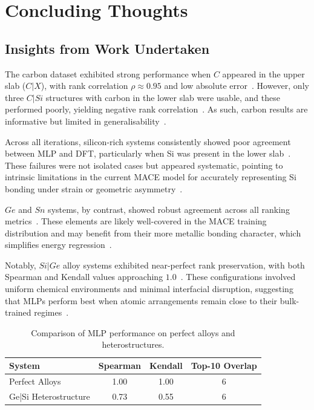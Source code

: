 \chapter{Concluding Thoughts} \label{chapter:conclusions}

\section{Insights from Work Undertaken} \label{section:insights_from_work}

The carbon dataset exhibited strong performance when $C$ appeared in the upper slab ($C|X$), with rank correlation $\rho \approx 0.95$ and low absolute error~\nocite{}.
However, only three $C|Si$ structures with carbon in the lower slab were usable, and these performed poorly, yielding negative rank correlation~\nocite{}.
As such, carbon results are informative but limited in generalisability~\nocite{}.

Across all iterations, silicon-rich systems consistently showed poor agreement between MLP and DFT, particularly when Si was present in the lower slab~\nocite{}.
These failures were not isolated cases but appeared systematic, pointing to intrinsic limitations in the current MACE model for accurately representing Si bonding under strain or geometric asymmetry~\nocite{}.

$Ge$ and $Sn$ systems, by contrast, showed robust agreement across all ranking metrics~\nocite{}.
These elements are likely well-covered in the MACE training distribution and may benefit from their more metallic bonding character, which simplifies energy regression~\nocite{}.

\newpage Notably, $Si|Ge$ alloy systems exhibited near-perfect rank preservation, with both Spearman and Kendall values approaching $1.0$~\nocite{}.
These configurations involved uniform chemical environments and minimal interfacial disruption, suggesting that MLPs perform best when atomic arrangements remain close to their bulk-trained regimes~\nocite{}.

\begin{table}[h]
    \centering
    \caption{Comparison of MLP performance on perfect alloys and heterostructures.}
    \begin{tabular}{lccc}
        System & Spearman & Kendall & Top-10 Overlap \\
        \hline
        Perfect Alloys & 1.00 & 1.00 & 6 \\
        Ge|Si Heterostructure & 0.73 & 0.55 & 6 \\
    \end{tabular}
\end{table}

